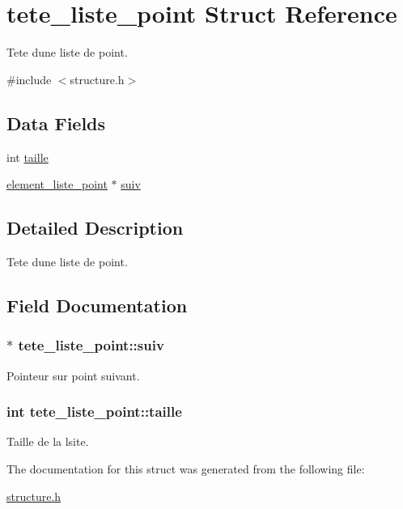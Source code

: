 \hypertarget{structtete__liste__point}{}\section{tete\+\_\+liste\+\_\+point Struct Reference}
\label{structtete__liste__point}


Tete d\textquotesingle{}une liste de point.  




{\ttfamily \#include $<$structure.\+h$>$}

\subsection*{Data Fields}
\begin{DoxyCompactItemize}
\item 
int \hyperlink{structtete__liste__point_ae270da5bb6242b1a435314512b46d77e}{taille}
\item 
\hyperlink{structelement__liste__point}{element\+\_\+liste\+\_\+point} $\ast$ \hyperlink{structtete__liste__point_afa51efc8ce1085a2be1c4ee078b33a86}{suiv}
\end{DoxyCompactItemize}


\subsection{Detailed Description}
Tete d\textquotesingle{}une liste de point. 

\subsection{Field Documentation}
\subsubsection[{\texorpdfstring{suiv}{suiv}}]{$\ast$ tete\+\_\+liste\+\_\+point\+::suiv}\hypertarget{structtete__liste__point_afa51efc8ce1085a2be1c4ee078b33a86}{}\label{structtete__liste__point_afa51efc8ce1085a2be1c4ee078b33a86}
Pointeur sur point suivant. 
\subsubsection[{\texorpdfstring{taille}{taille}}]{\setlength{\rightskip}{0pt plus 5cm}int tete\+\_\+liste\+\_\+point\+::taille}\hypertarget{structtete__liste__point_ae270da5bb6242b1a435314512b46d77e}{}\label{structtete__liste__point_ae270da5bb6242b1a435314512b46d77e}
Taille de la lsite. 

The documentation for this struct was generated from the following file\+:\begin{DoxyCompactItemize}
\item 
\hyperlink{structure_8h}{structure.\+h}\end{DoxyCompactItemize}
